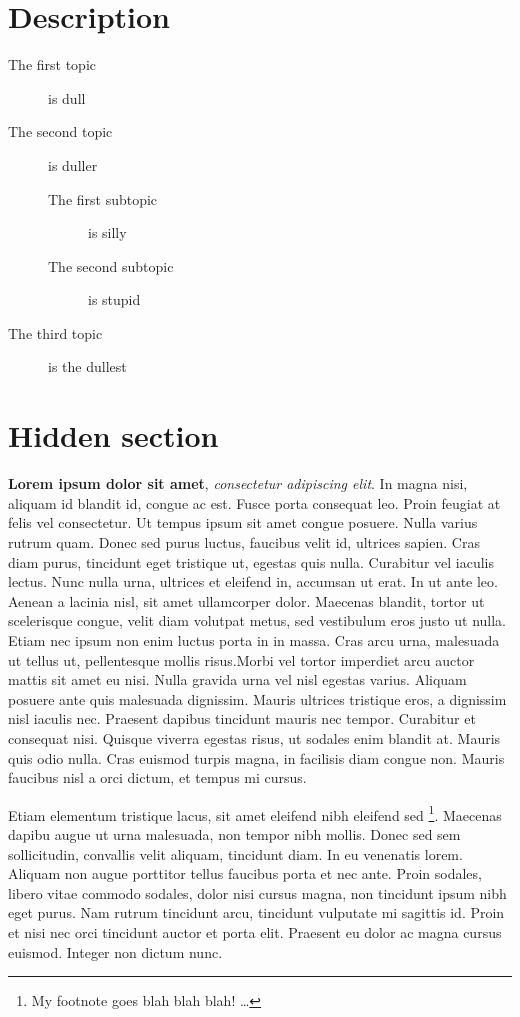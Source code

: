 \section*{Description}
\begin{description}
\item[The first topic] is dull
\item[The second topic] is duller
\begin{description}
\item[The first subtopic] is silly
\item[The second subtopic] is stupid
\end{description}
\item[The third topic] is the dullest
\end{description}


\clearpage

\tochide\section{Hidden section}
\textbf{Lorem ipsum dolor sit amet}, \textit{consectetur adipiscing elit}. In magna nisi, aliquam id blandit id, congue ac est. Fusce porta consequat leo. Proin feugiat at felis vel consectetur. Ut tempus ipsum sit amet congue posuere. Nulla varius rutrum quam. Donec sed purus luctus, faucibus velit id, ultrices sapien. Cras diam purus, tincidunt eget tristique ut, egestas quis nulla. Curabitur vel iaculis lectus. Nunc nulla urna, ultrices et eleifend in, accumsan ut erat. In ut ante leo. Aenean a lacinia nisl, sit amet ullamcorper dolor. Maecenas blandit, tortor ut scelerisque congue, velit diam volutpat metus, sed vestibulum eros justo ut nulla. Etiam nec ipsum non enim luctus porta in in massa. Cras arcu urna, malesuada ut tellus ut, pellentesque mollis risus.Morbi vel tortor imperdiet arcu auctor mattis sit amet eu nisi. Nulla gravida urna vel nisl egestas varius. Aliquam posuere ante quis malesuada dignissim. Mauris ultrices tristique eros, a dignissim nisl iaculis nec. Praesent dapibus tincidunt mauris nec tempor. Curabitur et consequat nisi. Quisque viverra egestas risus, ut sodales enim blandit at. Mauris quis odio nulla. Cras euismod turpis magna, in facilisis diam congue non. Mauris faucibus nisl a orci dictum, et tempus mi cursus.

Etiam elementum tristique lacus, sit amet eleifend nibh eleifend sed \footnote{My footnote goes blah blah blah! \dots}. Maecenas dapibu augue ut urna malesuada, non tempor nibh mollis. Donec sed sem sollicitudin, convallis velit aliquam, tincidunt diam. In eu venenatis lorem. Aliquam non augue porttitor tellus faucibus porta et nec ante. Proin sodales, libero vitae commodo sodales, dolor nisi cursus magna, non tincidunt ipsum nibh eget purus. Nam rutrum tincidunt arcu, tincidunt vulputate mi sagittis id. Proin et nisi nec orci tincidunt auctor et porta elit. Praesent eu dolor ac magna cursus euismod. Integer non dictum nunc.


